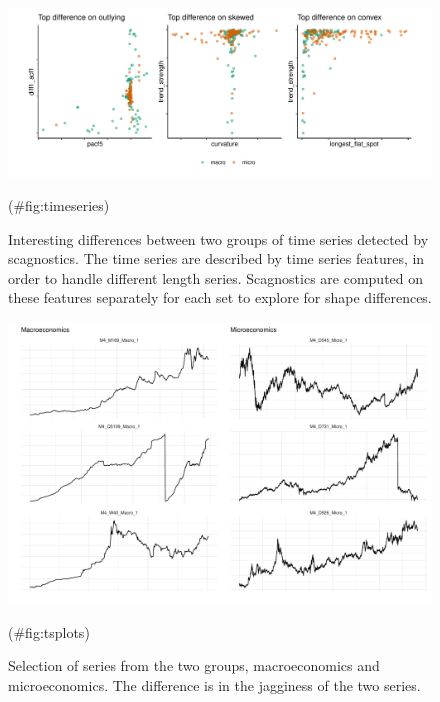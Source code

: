 \begin{Schunk}
\begin{figure}
\includegraphics[width=1\linewidth]{mason-lee-laa-cook_files/figure-latex/timeseries-1} \caption[Interesting differences between two groups of time series detected by scagnostics]{Interesting differences between two groups of time series detected by scagnostics. The time series are described by time series features, in order to handle different length series. Scagnostics are computed on these features separately for each set to explore for shape differences.}(\#fig:timeseries)
\end{figure}
\end{Schunk}

\begin{Schunk}
\begin{figure}
\includegraphics[width=1\linewidth]{mason-lee-laa-cook_files/figure-latex/tsplots-1} \caption[Selection of series from the two groups, macroeconomics and microeconomics]{Selection of series from the two groups, macroeconomics and microeconomics. The difference is in the jagginess of the two series.}(\#fig:tsplots)
\end{figure}
\end{Schunk}

